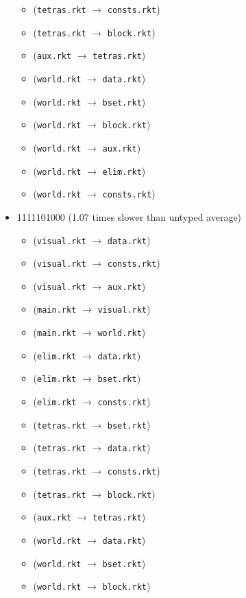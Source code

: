 \documentclass{article}
\newcommand{\mono}[1]{\texttt{#1}}
\begin{document}
\begin{itemize}
\begin{itemize}
  \item (\mono{tetras.rkt} $\rightarrow$ \mono{consts.rkt})
  \item (\mono{tetras.rkt} $\rightarrow$ \mono{block.rkt})
  \item (\mono{aux.rkt} $\rightarrow$ \mono{tetras.rkt})
  \item (\mono{world.rkt} $\rightarrow$ \mono{data.rkt})
  \item (\mono{world.rkt} $\rightarrow$ \mono{bset.rkt})
  \item (\mono{world.rkt} $\rightarrow$ \mono{block.rkt})
  \item (\mono{world.rkt} $\rightarrow$ \mono{aux.rkt})
  \item (\mono{world.rkt} $\rightarrow$ \mono{elim.rkt})
  \item (\mono{world.rkt} $\rightarrow$ \mono{consts.rkt})
  \end{itemize}
\item 1111101000 (1.07 times slower than untyped average)
  \begin{itemize}
  \item (\mono{visual.rkt} $\rightarrow$ \mono{data.rkt})
  \item (\mono{visual.rkt} $\rightarrow$ \mono{consts.rkt})
  \item (\mono{visual.rkt} $\rightarrow$ \mono{aux.rkt})
  \item (\mono{main.rkt} $\rightarrow$ \mono{visual.rkt})
  \item (\mono{main.rkt} $\rightarrow$ \mono{world.rkt})
  \item (\mono{elim.rkt} $\rightarrow$ \mono{data.rkt})
  \item (\mono{elim.rkt} $\rightarrow$ \mono{bset.rkt})
  \item (\mono{elim.rkt} $\rightarrow$ \mono{consts.rkt})
  \item (\mono{tetras.rkt} $\rightarrow$ \mono{bset.rkt})
  \item (\mono{tetras.rkt} $\rightarrow$ \mono{data.rkt})
  \item (\mono{tetras.rkt} $\rightarrow$ \mono{consts.rkt})
  \item (\mono{tetras.rkt} $\rightarrow$ \mono{block.rkt})
  \item (\mono{aux.rkt} $\rightarrow$ \mono{tetras.rkt})
  \item (\mono{world.rkt} $\rightarrow$ \mono{data.rkt})
  \item (\mono{world.rkt} $\rightarrow$ \mono{bset.rkt})
  \item (\mono{world.rkt} $\rightarrow$ \mono{block.rkt})

\end{itemize}
\end{itemize}
\end{document}
